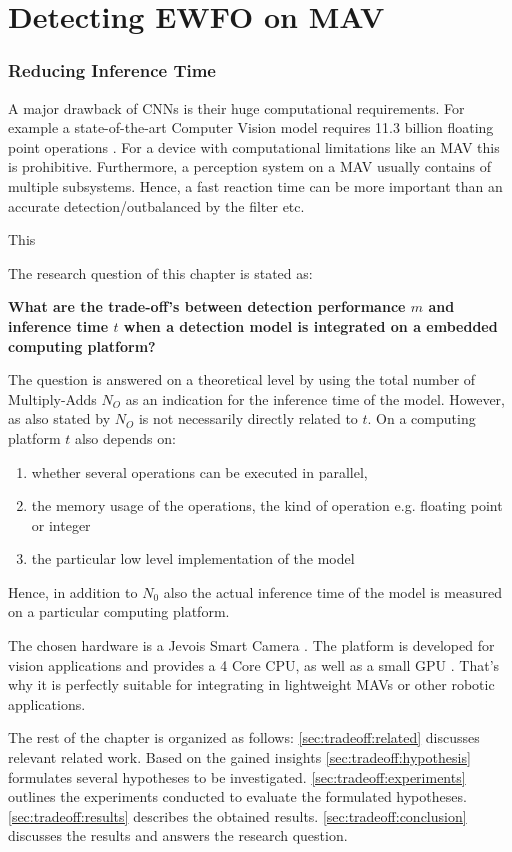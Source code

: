 	\chapter{Detecting \ac{EWFO} on \ac{MAV}}
	\label{sec:object_detection}
	
	\subsection{Reducing Inference Time}
	
	A major drawback of \acp{CNN} is their huge computational requirements. For example a state-of-the-art Computer Vision model \cite{He2015} requires 11.3 billion floating point operations \cite{Tschannen2017}. For a device with computational limitations like an \ac{MAV} this is prohibitive. Furthermore, a perception system on a \ac{MAV} usually contains of multiple subsystems. Hence, a fast reaction time can be more important than an accurate detection/outbalanced by the filter etc.
	
	This
	
	The research question of this chapter is stated as:
	
	\begin{center}
		\textbf{What are the trade-off's between detection performance $m$ and inference time $t$ when a detection model is integrated on a embedded computing platform?}
	\end{center}
	
	The question is answered on a theoretical level by using the total number of \ac{Multiply-Adds} $N_O$ as an indication for the inference time of the model. However, as also stated by  $N_O$ is not necessarily directly related to $t$. On a computing platform $t$ also depends on:
	
	\begin{enumerate}
		\item whether several operations can be executed in parallel,
		\item the memory usage of the operations, the kind of operation e.g. floating point or integer
		\item the particular low level implementation of the model
	\end{enumerate} 
	
	Hence, in addition to $N_0$ also the actual inference time of the model is measured on a particular computing platform.
	
	The chosen hardware is a Jevois Smart Camera . The platform is developed for vision applications and provides a 4 Core CPU, as well as a small GPU . That's why it is perfectly suitable for integrating in lightweight \acp{MAV} or other robotic applications.
	
	The rest of the chapter is organized as follows: \autoref{sec:tradeoff:related} discusses relevant related work. Based on the gained insights \autoref{sec:tradeoff:hypothesis} formulates several hypotheses to be investigated. \autoref{sec:tradeoff:experiments} outlines the experiments conducted to evaluate the formulated hypotheses. \autoref{sec:tradeoff:results} describes the obtained results. \autoref{sec:tradeoff:conclusion} discusses the results and answers the research question.
	